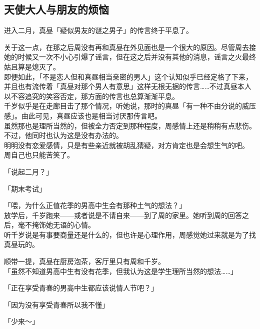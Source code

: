 \subsection{天使大人与朋友的烦恼}

进入二月，真昼「疑似男友的谜之男子」的传言终于平息了。

关于这一点，在那之后周没有再和真昼在外见面也是一个很大的原因。尽管周去接她的时候又一次不小心引爆了谣言，但在这之后并没有其他的消息，谣言之火最终姑且算是熄灭了。\\

即便如此，「不是恋人但和真昼相当亲密的男人」这个认知似乎已经定格了下来，并且也有流传着「真昼对那个男人有意思」这样无根无据的传言……不过真昼本人以不容追究的笑容否定，那方面的传言也总算渐渐平息。\\

千岁似乎是在走廊目击了那个情况，听她说，那时的真昼「有一种不由分说的威压感」。由此可见，真昼应该也是相当讨厌那传言吧。\\

虽然那也是理所当然的，但被全力否定到那种程度，周感情上还是稍稍有点悲伤。不过，他同时也认为这是没有办法的。\\

明明没有恋爱感情，只是有些亲近就被胡乱猜疑，对方肯定也是会想生气的吧。\\

周自己也只能苦笑了。\\

\vspace{2\baselineskip}

「说起二月？」

「期末考试」

「喂，为什么正值花季的男高中生会有那种土气的想法？」\\

放学后，千岁跑来——或者说是不请自来——到了周的家里。她听到周的回答之后，毫不掩饰她无语的心情。\\

听千岁说是有事要商量还是什么的，但也许是心理作用，周感觉她过来就是为了找真昼玩的。

顺带一提，真昼在厨房泡茶，客厅里只有周和千岁。\\

「虽然不知道男高中生有没有花季，但我认为这是学生理所当然的想法……」

「正在享受青春的男高中生都应该说情人节吧？」

「因为没有享受青春所以我不懂」

「少来～」\\

